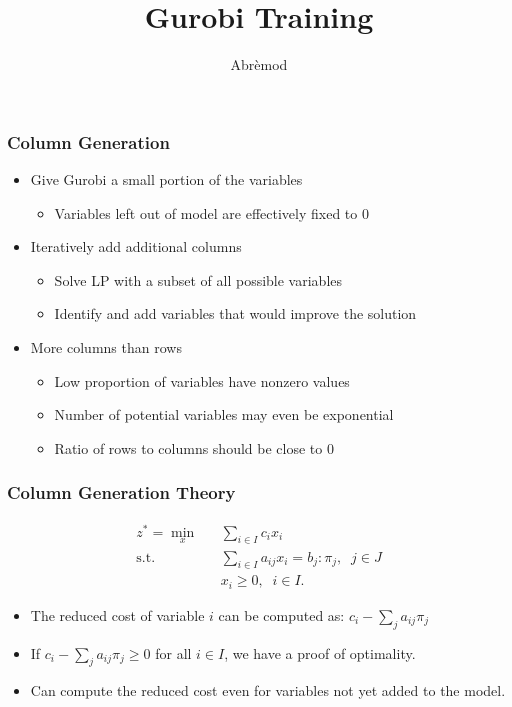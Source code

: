 \documentclass[12pt,handout]{beamer}
\title{Gurobi Training}
\author{Abr\`emod}
\begin{document}
\begin{frame}
\frametitle{Column Generation}
\begin{itemize}
  \item Give Gurobi a small portion of the variables
    \begin{itemize}
      \item Variables left out of model are effectively fixed to 0
    \end{itemize}
  \item Iteratively add additional columns
    \begin{itemize}
    \item Solve LP with a subset of all possible variables
    \item Identify and add variables that would improve the solution
    \end{itemize}      
    \item More columns than rows
    \begin{itemize}
      \item Low proportion of variables have nonzero values
      \item Number of potential variables may even be exponential
      \item Ratio of rows to columns should be close to 0
    \end{itemize}
\end{itemize}
\end{frame}

\begin{frame}
\frametitle{Column Generation Theory}
\begin{eqnarray}
z^* = \min_x && \sum_{i \in I} c_i x_i  \nonumber \\
\mbox{s.t.} && \sum_{i \in I} a_{ij} x_i  = b_j : \pi_j,\;\;j \in J \nonumber \\
&& x_i \ge 0,\;\;i \in I. \nonumber
\end{eqnarray}

\begin{itemize}
\item The reduced cost of variable $i$ can be computed as: $c_i - \sum_{j} a_{ij} \pi_j$
\item If $c_i - \sum_{j} a_{ij} \pi_j \ge 0$ for all $i \in I$, we have a proof of optimality.
\item Can compute the reduced cost even for variables not yet added to the model.
\end{itemize}
\end{frame}
\end{document}
